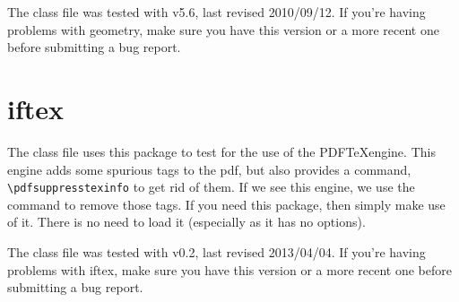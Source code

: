 The class file was tested with v5.6, last revised 2010/09/12.  If you're having problems with geometry, make sure you have this version or a more recent one before submitting a bug report.

\section{iftex}
The class file uses this package to test for the use of the PDF\TeX engine.  This engine adds some spurious tags to the pdf, but also provides a command, \verb=\pdfsuppresstexinfo= to get rid of them.  If we see this engine, we use the command to remove those tags.  If you need this package, then simply make use of it.  There is no need to load it (especially as it has no options).

The class file was tested with v0.2, last revised 2013/04/04.  If you're having problems with iftex, make sure you have this version or a more recent one before submitting a bug report.

\endinput